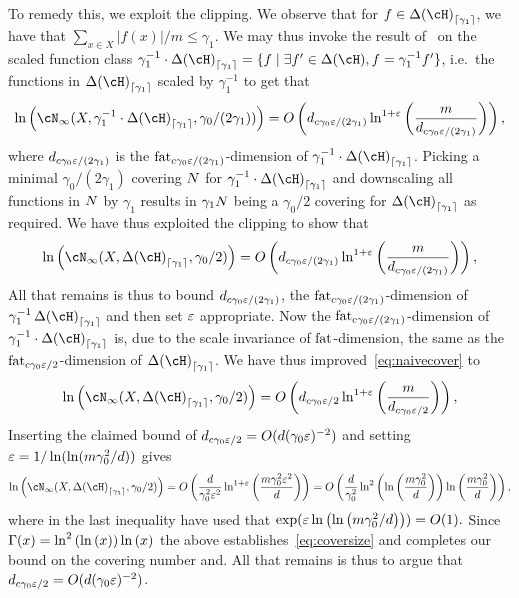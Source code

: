 To remedy this, we exploit the clipping. We observe that for $ f\in \dlh_{\left\lceil\gamma_1 \right\rceil} $, we have that $ \sum_{x\in X}|f(x)|/m \leq \gamma_1$. We may thus invoke the result of~\cite{RudelsonVershynin} on the scaled function class $ \gamma_1^{-1} \cdot\dlh_{\left\lceil\gamma_1 \right\rceil} =\{ f\mid \exists f'\in \dlh, f=\gamma_1^{-1} f'  \} $, i.e.\ the functions in $ \dlh_{\left\lceil\gamma_1 \right\rceil} $ scaled by $ \gamma_1^{-1} $ to get that
\[
  \ln{\left(\cN_{\infty}(X,\gamma_1^{-1} \cdot\dlh_{\left\lceil\gamma_1 \right\rceil},\gamma_0/(2\gamma_1)) \right)}=O\left(d_{c\gamma_0\eps/(2\gamma_1)}\ln^{1+\eps}{\left(\frac{m}{d_{c\gamma_0\eps/(2\gamma_1)}} \right)}\right),
\]
where $ d_{c\gamma_0\varepsilon/(2\gamma_1)} $ is the $ \operatorname{\mathrm{fat}}_{c\gamma_0\varepsilon/(2\gamma_1)}$-dimension of $ \gamma_1^{-1} \cdot\dlh_{\left\lceil\gamma_1 \right\rceil}$. Picking a minimal $\gamma_0/(2 \gamma_1)$ covering $N$ for $\gamma_1^{-1} \cdot\dlh_{\left\lceil\gamma_1 \right\rceil}$ and downscaling all functions in $N$ by $\gamma_1$ results in $\gamma_1 N$ being a $\gamma_0/2$ covering for $\dlh_{\left\lceil\gamma_1 \right\rceil}$ as required. We have thus exploited the clipping to show that
\[
  \ln{\left(\cN_{\infty}(X,\dlh_{\left\lceil\gamma_1 \right\rceil},\gamma_0/2) \right)}=O\left(d_{c\gamma_0\eps/(2\gamma_1)}\ln^{1+\eps}{\left(\frac{m}{d_{c\gamma_0\eps/(2\gamma_1)}} \right)}\right),
\]
All that remains is thus to bound $d_{c\gamma_0\varepsilon/(2 \gamma_1)}$, the $ \operatorname{\mathrm{fat}}_{c\gamma_0\varepsilon/(2\gamma_1)}$-dimension of $\gamma_1^{-1} \dlh_{\left\lceil\gamma_1 \right\rceil}$ and then set $ \varepsilon $ appropriate. Now the  $ \operatorname{\mathrm{fat}}_{c\gamma_0\varepsilon/(2 \gamma_1)} $-dimension of $ \gamma_1^{-1} \cdot\dlh_{\left\lceil\gamma_1 \right\rceil}$ is, due to the scale invariance of $ \operatorname{\mathrm{fat}} $-dimension, the same as the  $ \operatorname{\mathrm{fat}}_{c\gamma_0\varepsilon/2} $-dimension of $ \dlh_{\left\lceil\gamma_1 \right\rceil}$. We have thus improved~\cref{eq:naivecover} to
\begin{align*}
\ln{\left(\cN_{\infty}(X,\dlh_{\left\lceil\gamma_1 \right\rceil},\gamma_0/2) \right)}=O\left(d_{c\gamma_0\eps/2}\ln^{1+\eps}\left(\frac{m}{d_{c\gamma_0\eps/2} } \right) \right), 
\end{align*}
Inserting the claimed bound of $d_{c\gamma_0\varepsilon/2} = O(d (\gamma_0\varepsilon)^{-2})$ and setting $ \varepsilon=1/\ln(\ln(m\gamma_{0}^{2}/d)) $  gives
\begin{align*}
  \ln{\left(\cN_{\infty}(X,\dlh_{\left\lceil\gamma_1 \right\rceil},\gamma_0/2) \right)}=O\left(\frac{d}{\gamma_{0}^{2}\eps^{2}}\ln^{1+\eps}\left(\frac{m\gamma_{0}^{2}\eps^{2}}{d} \right) \right)=O\left(\frac{d}{\gamma_{0}^{2}}\ln^{2}{\left(\ln{\left( \frac{m\gamma_{0}^{2}}{d}\right)} \right)}\ln\left(\frac{m\gamma_{0}^{2}}{d} \right) \right), 
  \end{align*}
where in the last inequality have used that $ \exp(\varepsilon\ln{\left(\ln{\left(m\gamma_{0}^{2}/d \right)} \right)})=O(1).$ Since $ \operatorname{\Gamma}(x)=\ln^{2}{\left(\ln{\left(x \right)} \right)}\ln{\left(x \right)} $ the above establishes~\cref{eq:coversize} and completes our bound on the covering number and. All that remains is thus to argue that $d_{c\gamma_0\varepsilon/2}= O(d (\gamma_0\varepsilon)^{-2})$.

